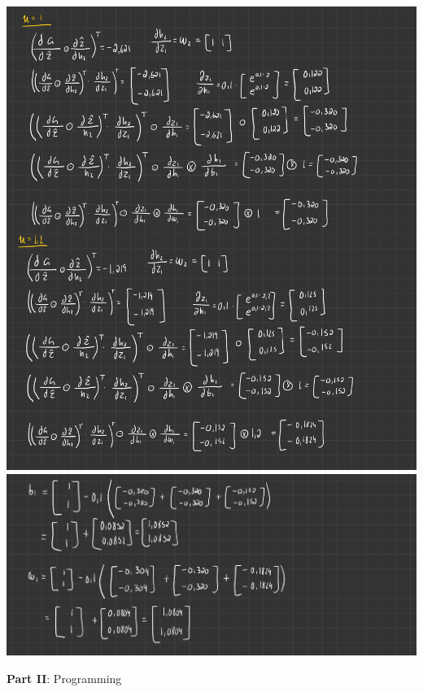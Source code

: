 \documentclass[12pt]{article}
\begin{document}
\begin{enumerate}[leftmargin=\labelsep]
\begin{center}
\newline
\includegraphics[scale=0.3]{images/hw3-4.jpg}
\newline
\includegraphics[scale=0.3]{images/hw3-5.jpg}
\newline
\end{center}
\end{enumerate}
\newpage
\center\large{\textbf{Part II}: Programming}
\end{document}
